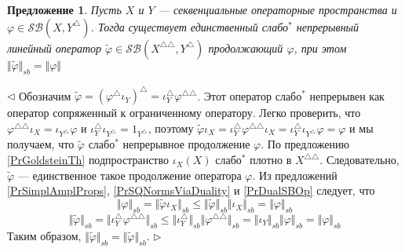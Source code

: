 \documentclass[12pt]{article}
\newtheorem{proposition}[theorem]{Предложение}
\newenvironment{proof}{\par $\triangleleft$}{$\triangleright$}
\begin{document}
\begin{proposition}\label{PrWStarContExtSBOp} Пусть $X$ и $Y$ --- секвенциальные операторные пространства и $\varphi\in \mathcal{SB}(X,Y^\triangle)$. Тогда существует единственный слабо${}^*$ непрерывный линейный оператор $\widetilde{\varphi}\in\mathcal{SB}(X^{\triangle\triangle},Y^\triangle)$ продолжающий $\varphi$, при этом $\Vert\widetilde{\varphi}\Vert_{sb}=\Vert\varphi\Vert$ 
\end{proposition}
\begin{proof} Обозначим $\widetilde{\varphi}=(\varphi^\triangle\iota_Y)^\triangle=\iota_{Y}^\triangle\varphi^{\triangle\triangle}$. Этот оператор слабо${}^*$ непрерывен как оператор сопряженный к ограниченному оператору. Легко проверить, что $\varphi^{\triangle\triangle}\iota_X=\iota_{Y^\triangle}\varphi$ и $\iota_Y^\triangle\iota_{Y^\triangle}=1_{Y^\triangle}$, поэтому $\widetilde{\varphi}\iota_X=\iota_{Y}^\triangle\varphi^{\triangle\triangle}\iota_X=\iota_{Y}^\triangle\iota_{Y^\triangle}\varphi=\varphi$ и мы получаем, что $\widetilde{\varphi}$ слабо${}^*$ непрерывное продолжение $\varphi$. По предложению \ref{PrGoldsteinTh} подпространство $\iota_X(X)$ слабо${}^*$ плотно в $X^{\triangle\triangle}$. Следовательно, $\widetilde{\varphi}$ --- единственное такое продолжение оператора $\varphi$. Из предложений \ref{PrSimplAmplProps}, \ref{PrSQNormsViaDuality} и \ref{PrDualSBOp} следует, что
$$
\Vert\varphi\Vert_{sb}
=\Vert\widetilde{\varphi}\iota_X\Vert_{sb}
\leq\Vert\widetilde{\varphi}\Vert_{sb}\Vert\iota_X\Vert_{sb}
=\Vert\varphi\Vert_{sb}
$$
$$
\Vert\widetilde{\varphi}\Vert_{sb}
=\Vert\iota_{Y}^\triangle\varphi^{\triangle\triangle}\Vert_{sb}
\leq\Vert\iota_{Y}^\triangle\Vert_{sb}\Vert\varphi^{\triangle\triangle}\Vert_{sb}
=\Vert\iota_{Y}\Vert_{sb}\Vert\varphi\Vert_{sb}
=\Vert\varphi\Vert_{sb}
$$
Таким образом, $\Vert\widetilde{\varphi}\Vert_{sb}=\Vert\widetilde{\varphi}\Vert_{sb}$.
\end{proof}
\end{document}
